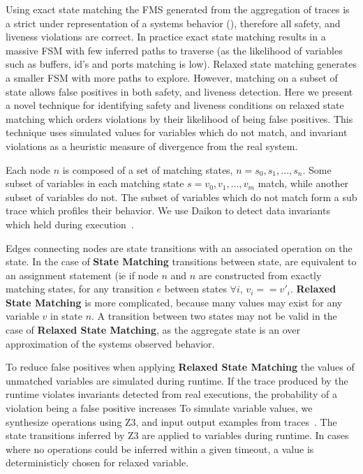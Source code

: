 Using exact state matching the FMS generated from the aggregation of traces is
a strict under representation of a systems behavior (), therefore all safety, and liveness violations are
correct. In practice exact state matching results in a massive FSM with few
inferred paths to traverse (as the likelihood of variables such as buffers,
id's and ports matching is low). Relaxed state matching generates a smaller FSM
with more paths to explore. However, matching on a subset of state allows
false positives in both safety, and liveness detection. Here we present a novel
technique for identifying safety and liveness conditions on relaxed state
matching which orders violations by their likelihood of being false positives.
This technique uses simulated values for variables which do not match, and
invariant violations as a heuristic measure of divergence from the real system.

Each node $n$ is composed of a set of matching states, $n =
{s_0,s_1,\dots,s_n}$. Some subset of variables in each matching state $s =
{v_0,v_1,\dots,v_m}$ match, while another subset of variables do not. The
subset of variables which do not match form a sub trace which profiles their
behavior. We use Daikon to detect data invariants which held during
execution~\cite{Ernst07}.

Edges connecting nodes are state transitions with an associated operation on
the state. In the case of \textbf{State Matching} transitions between state,
are equivalent to an assignment statement (ie if node $n$ and $n$ are
constructed from exactly matching states, for any transition $e$ between states
$\forall i$, $v_i == v'_i$. \textbf{Relaxed State Matching} is more
complicated, because many values may exist for any variable $v$ in state $n$. A
transition between two states may not be valid in the case of \textbf{Relaxed
State Matching}, as the aggregate state is an over approximation of the systems
observed behavior.

To reduce false positives when applying \textbf{Relaxed State Matching} the
values of unmatched variables are simulated during runtime. If the trace
produced by the runtime violates invariants detected from real executions, the
probability of a violation being a false positive increases  To simulate variable values, we synthesize operations
using Z3, and input output examples from traces~\cite{SMTSynth}. The state
transitions inferred by Z3 are applied to variables during runtime. In cases
where no operations could be inferred within a given timeout, a value is
deterministicly chosen for relaxed variable.

